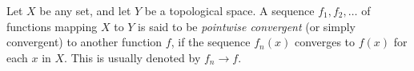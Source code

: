 \documentclass[12pt]{article}
\begin{document}
Let $X$ be any set, and let $Y$ be a topological space. 
A sequence $f_1,f_2,\dots$ of functions mapping $X$ to $Y$ is said to be \emph{pointwise convergent} (or simply convergent) to another function $f$, if the sequence $f_n(x)$ converges to $f(x)$ for each $x$ in $X$. This is usually denoted by $f_n\rightarrow f$.
\end{document}
